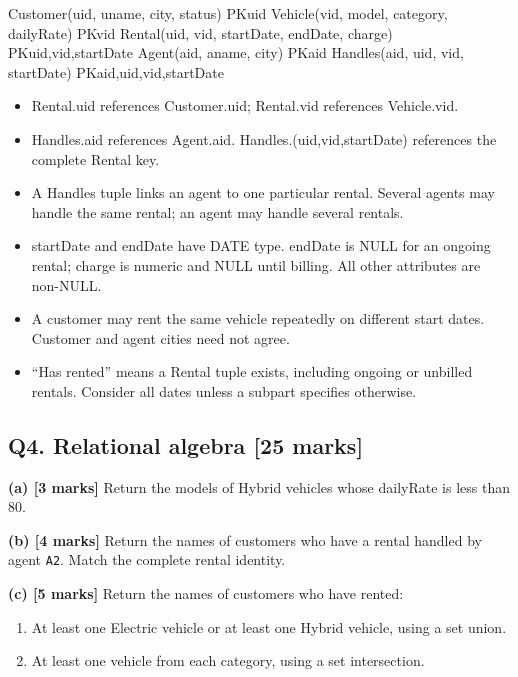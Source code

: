\begin{StudyCode}
Customer(uid, uname, city, status)         PK{uid}
Vehicle(vid, model, category, dailyRate)   PK{vid}
Rental(uid, vid, startDate, endDate, charge)
  PK{uid,vid,startDate}
Agent(aid, aname, city)                   PK{aid}
Handles(aid, uid, vid, startDate)          PK{aid,uid,vid,startDate}
\end{StudyCode}

\begin{itemize}
\tightlist
\item
  Rental.uid references Customer.uid; Rental.vid references Vehicle.vid.
\item
  Handles.aid references Agent.aid. Handles.(uid,vid,startDate) references the complete Rental key.
\item
  A Handles tuple links an agent to one particular rental. Several agents may handle the same rental; an agent may handle several rentals.
\item
  startDate and endDate have DATE type. endDate is NULL for an ongoing rental; charge is numeric and NULL until billing. All other attributes are non-NULL.
\item
  A customer may rent the same vehicle repeatedly on different start dates. Customer and agent cities need not agree.
\item
  ``Has rented'' means a Rental tuple exists, including ongoing or unbilled rentals. Consider all dates unless a subpart specifies otherwise.
\end{itemize}

\subsection{Q4. Relational algebra {[}25 marks{]}}\label{practice_paper_2-q4.-relational-algebra-25-marks}

\textbf{(a) {[}3 marks{]}} Return the models of Hybrid vehicles whose dailyRate is less than 80.

\textbf{(b) {[}4 marks{]}} Return the names of customers who have a rental handled by agent \texttt{\textquotesingle{}A2\textquotesingle{}}. Match the complete rental identity.

\textbf{(c) {[}5 marks{]}} Return the names of customers who have rented:

\begin{enumerate}
\def\labelenumi{\arabic{enumi}.}
\tightlist
\item
  At least one Electric vehicle or at least one Hybrid vehicle, using a set union.
\item
  At least one vehicle from each category, using a set intersection.
\end{enumerate}

